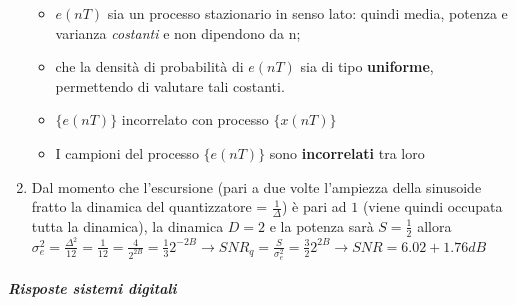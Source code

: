 \documentclass[
]{article}
\begin{document}
\begin{enumerate}
  \begin{itemize}
  \item
    \(e(nT)\) sia un processo stazionario in senso lato: quindi media,
    potenza e varianza \emph{costanti} e non dipendono da n;
  \item
    che la densità di probabilità di \(e(nT)\) sia di tipo
    \textbf{uniforme}, permettendo di valutare tali costanti.
  \item
    \(\{e(nT)\}\) incorrelato con processo \(\{x(nT)\}\)
  \item
    I campioni del processo \(\{e(nT)\}\) sono \textbf{incorrelati} tra
    loro
  \end{itemize}
\item
  Dal momento che l'escursione (pari a due volte l'ampiezza della
  sinusoide fratto la dinamica del quantizzatore = \(\frac{1}{\Delta}\))
  è pari ad \(1\) (viene quindi occupata tutta la dinamica), la dinamica
  \(D=2\) e la potenza sarà \(S=\frac{1}{2}\) allora
  \(\sigma^2_e = \frac{\Delta^2}{12}=\frac{1}{12} = \frac{4}{2^{2B}}=\frac{1}{3} 2^{-2B} \to SNR_q=\frac{S}{\sigma^2_e}=\frac{3}{2}2^{2B} \to SNR=6.02+1.76dB\)
\end{enumerate}

\subparagraph{Risposte sistemi
digitali}\label{risposte-sistemi-digitali}
\end{document}
